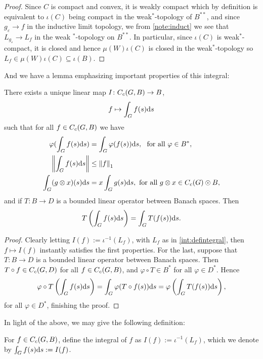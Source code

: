 \begin{proof}
Since $C$ is compact and convex, it is weakly compact which by definition is equivalent to $\iota(C)$ being compact in the weak$^*$-topology of $B^{**}$, and since $g_{\varepsilon} \to f$ in the inductive limit topology, we from \ref{note:induct} we see that $L_{g_\varepsilon } \to L_f$ in the weak $^*$-topology on $B^{**}$. In particular, since $\iota(C)$ is weak$^*$-compact, it is closed and hence $\mu(W) \iota(C)$ is closed in the weak$^*$-topology so $L_f \in \mu(W) \iota(C) \subseteq \iota(B)$.
\end{proof}
And we have a lemma emphasizing important properties of this integral:
\begin{lemma}
There exists a unique linear map $I \colon C_c(G,B) \to B$,
\begin{align*}
f \mapsto \int_G f(s) \mathrm{d} s
\end{align*}
such that for all $f \in C_c(G,B)$ we have
\begin{align}
\varphi(\int_G f(s) \mathrm{d} s ) &= \int_G \varphi(f(s)) \mathrm{d} s, \ \text{ for all } \varphi \in B^*,\\
\left\lVert \int_G f(s) \mathrm{d} s \right\rVert &\leq \left\lVert f \right\rVert_1 \\
\int_G (g \otimes x) (s) \mathrm{d} s &=x \int_G g(s) \mathrm{d} s, \text{ for all } g \otimes x \in C_c(G) \odot B,
\end{align}
and if $T \colon B \to D$ is a bounded linear operator between Banach spaces. Then
\begin{align*}
T\left( \int_G f(s) \mathrm{d} s \right) = \int_G T(f(s)) \mathrm{d} s.
\end{align*}
\label{int:bochnerproperties}
\end{lemma}
\begin{proof}
Clearly letting $I(f) := \iota^{-1}(L_f)$, with $L_f$ as in \ref{int:defintegral}, then $f \mapsto I(f)$ instantly satisfies the first properties. For the last, suppose that $T \colon B \to D$ is a bounded linear operator between Banach spaces. Then $T \circ f \in C_c(G,D)$ for all $f \in C_c(G,B)$, and $\varphi \circ T \in B^*$ for all $ \varphi \in D^*$. Hence 
\begin{align*}
	\varphi \circ T \left( \int_G f(s) \mathrm{d} s  \right) = \int_G \varphi( T \circ f (s) ) \mathrm{d} s = \varphi \left( \int_G T (f(s)) \mathrm{d} s \right),
\end{align*}
for all $\varphi \in D^*$, finishing the proof.
\end{proof}
In light of the above, we may give the following definition:
\begin{definition}
For $f \in C_c(G,B)$, define the integral of $f$ as $I(f) := \iota^{-1}(L_f)$, which we denote by $\int_G f(s) \mathrm{d} s := I(f)$.
\end{definition}

